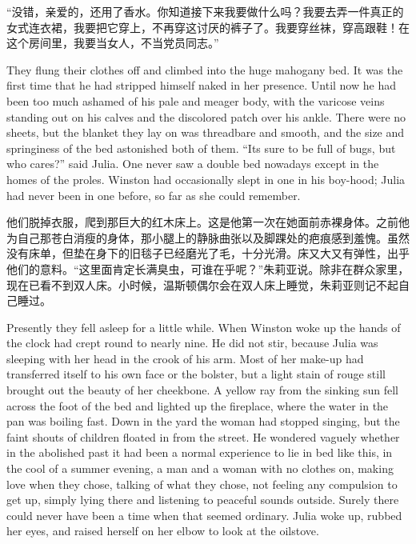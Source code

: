 \begin{paracol}{2}
\switchcolumn

``没错，亲爱的，还用了香水。你知道接下来我要做什么吗？我要去弄一件真正的女式连衣裙，我要把它穿上，不再穿这讨厌的裤子了。我要穿丝袜，穿高跟鞋！在这个房间里，我要当女人，不当党员同志。''

\switchcolumn*

They flung their clothes off and climbed into the huge mahogany bed. It
was the first time that he had stripped himself naked in her presence.
Until now he had been too much ashamed of his pale and meager body, with
the varicose veins standing out on his calves and the discolored patch
over his ankle. There were no sheets, but the blanket they lay on was
threadbare and smooth, and the size and springiness of the bed
astonished both of them. ``It\textquotesingle s sure to be full of bugs,
but who cares?'' said Julia. One never saw a double bed nowadays except
in the homes of the proles. Winston had occasionally slept in one in his
boy-hood; Julia had never been in one before, so far as she could
remember.

\switchcolumn

他们脱掉衣服，爬到那巨大的红木床上。这是他第一次在她面前赤裸身体。之前他为自己那苍白消瘦的身体，那小腿上的静脉曲张以及脚踝处的疤痕感到羞愧。虽然没有床单，但垫在身下的旧毯子已经磨光了毛，十分光滑。床又大又有弹性，出乎他们的意料。``这里面肯定长满臭虫，可谁在乎呢？''朱莉亚说。除非在群众家里，现在已看不到双人床。小时候，温斯顿偶尔会在双人床上睡觉，朱莉亚则记不起自己睡过。

\switchcolumn*

Presently they fell asleep for a little while. When Winston woke up the
hands of the clock had crept round to nearly nine. He did not stir,
because Julia was sleeping with her head in the crook of his arm. Most
of her make-up had transferred itself to his own face or the bolster,
but a light stain of rouge still brought out the beauty of her
cheekbone. A yellow ray from the sinking sun fell across the foot of the
bed and lighted up the fireplace, where the water in the pan was boiling
fast. Down in the yard the woman had stopped singing, but the faint
shouts of children floated in from the street. He wondered vaguely
whether in the abolished past it had been a normal experience to lie in
bed like this, in the cool of a summer evening, a man and a woman with
no clothes on, making love when they chose, talking of what they chose,
not feeling any compulsion to get up, simply lying there and listening
to peaceful sounds outside. Surely there could never have been a time
when that seemed ordinary. Julia woke up, rubbed her eyes, and raised
herself on her elbow to look at the oilstove.


\end{paracol}
